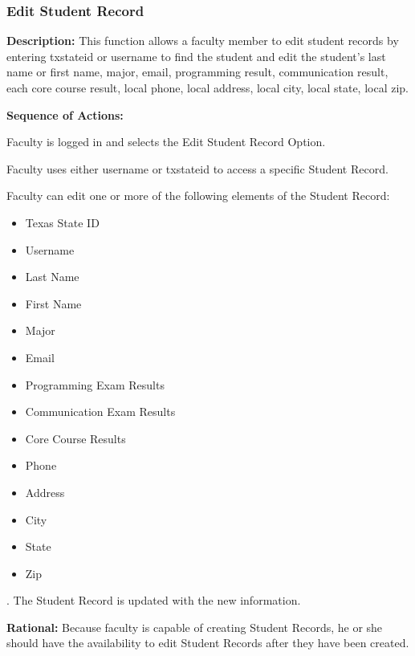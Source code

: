    \subsubsection{\large Edit Student Record} 
   \begin{boxed} %
      \textbf{Description:}
      {\small This function allows a faculty member to edit student records by
         entering txstateid or username to find the student and edit the
         student's last name or first name, major, email, programming result,
         communication result, each core course result, local phone, local
         address, local city, local state, local zip.}
         
         \textbf{Sequence of Actions:}
         \begin{enumerate}
               {\small
            \item Faculty is logged in and selects the Edit Student Record Option.
            \item Faculty uses either username or txstateid to access a specific
               Student Record.
            \item Faculty can edit one or more of the following elements of the
               Student Record:
               \begin{itemize}
                  \item Texas State ID
                  \item Username
                  \item Last Name
                  \item First Name
                  \item Major
                  \item Email
                  \item Programming Exam Results
                  \item Communication Exam Results
                  \item Core Course Results
                  \item Phone
                  \item Address
                  \item City
                  \item State
                  \item Zip
               \end{itemize}
            \item. The Student Record is updated with the new information.}
      \end{enumerate}

         \textbf{Rational:}
         {\small Because faculty is capable of creating Student Records, he or she
         should have the availability to edit Student Records after they have
      been created.}
   \end{boxed} %

